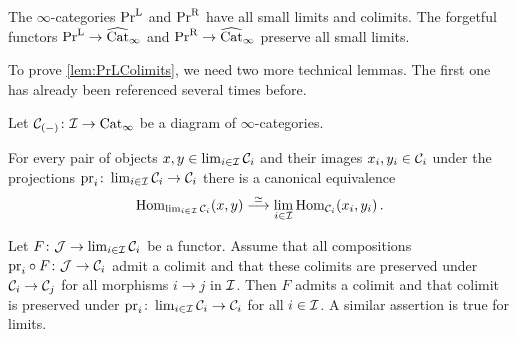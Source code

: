 \begin{lem}\label{lem:PrLColimits}
	The $\infty$-categories $\mathrm{Pr}^{\mathrm{L}}$ and $\mathrm{Pr}^{\mathrm{R}}$ have all small limits and colimits. The forgetful functors $\mathrm{Pr}^{\mathrm{L}}\rightarrow \widehat{\mathrm{Cat}}_\infty$ and $\mathrm{Pr}^{\mathrm{R}}\rightarrow \widehat{\mathrm{Cat}}_\infty$ preserve all small limits.
\end{lem}
To prove \cref{lem:PrLColimits}, we need two more technical lemmas. The first one has already been referenced several times before.
\begin{lem}\label{lem:HomInLimits}
	Let $\mathcal{C}_{(-)}\colon\mathcal{I}\rightarrow\mathrm{Cat}_\infty$  be a diagram of $\infty$-categories.
	\begin{alphanumerate}
		\item For every pair of objects $x,y\in\operatorname*{lim}_{i\in\mathcal{I}}\mathcal{C}_i$ and their images $x_i,y_i\in \mathcal{C}_i$ under the projections $\operatorname{pr}_i\colon \operatorname*{lim}_{i\in\mathcal{I}}\mathcal{C}_i\rightarrow \mathcal{C}_i$ there is a canonical equivalence\label{enum:HomInLimits}
		\begin{equation*}
			\Hom_{\limit_{i\in\Ii}\Cc_i}\left(x,y\right)\overset{\simeq}{\longrightarrow}\limit_{i\in\Ii}\Hom_{\Cc_i}\left(x_i,y_i\right)\,.
		\end{equation*}
		\item Let $F\colon \mathcal{J}\rightarrow \operatorname*{lim}_{i\in\mathcal{I}}\mathcal{C}_i$ be a functor. Assume that all compositions ${\operatorname{pr}_i}\circ F\colon \mathcal{J}\rightarrow \mathcal{C}_i$ admit a colimit and that these colimits are preserved under $\mathcal{C}_i\rightarrow\mathcal{C}_j$ for all morphisms $i\rightarrow j$ in $\mathcal{I}$. Then $F$ admits a colimit and that colimit is preserved under $\operatorname{pr}_i\colon\operatorname*{lim}_{i\in \mathcal{I}}\mathcal{C}_i\rightarrow \mathcal{C}_i$ for all $i\in \mathcal{I}$. A similar assertion is true for limits.\label{enum:ColimitsInLimits}
	\end{alphanumerate}
\end{lem}
